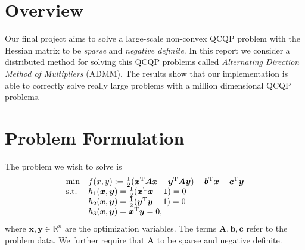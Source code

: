 
%

\section{Overview}
Our final project aims to solve a large-scale non-convex QCQP problem with the Hessian matrix to be \emph{sparse} and \emph{negative definite}. In this report we consider a distributed method for solving this QCQP problems called \emph{Alternating Direction Method of Multipliers} (ADMM). The results show that our implementation is able to correctly solve really large problems with a million dimensional QCQP problems.

\section{Problem Formulation}
The problem we wish to solve is
\[
\begin{array}{ll}
\min&f(x,y):=\frac{1}{2}(\bm x^{\mathrm T}\bm A\bm x+\bm y^{\mathrm T}\bm A\bm y)-\bm b^{\mathrm T}\bm x-\bm c^{\mathrm T}\bm y\\
\mbox{s.t.}&h_1(\bm x,\bm y)=\frac{1}{2}(\bm x^{\mathrm T}\bm x-1)=0\\
&h_2(\bm x,\bm y)=\frac{1}{2}(\bm y^{\mathrm T}\bm y-1)=0\\
&h_3(\bm x,\bm y)=\bm x^{\mathrm T}\bm y=0,
\end{array}
\]
where $\bm x,\bm y\in\mathbb{R}^n$ are the optimization variables. The terms $\bm A,\bm b,\bm c$ refer to the problem data. We further require that $\bm A$ to be sparse and negative definite.

